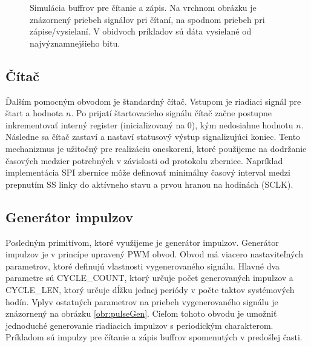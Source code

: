\begin{figure}
    \centering
    \vfill
    \caption[Simulácia buffrov pre čítanie a zápis]{Simulácia buffrov pre čítanie a zápis. Na vrchnom obrázku je znázornený priebeh signálov pri čítaní, na spodnom priebeh pri zápise/vysielaní. V obidvoch príkladov sú dáta vysielané od najvýznamnejšieho bitu.}
    \label{obr:bufferSim}
\end{figure}

\subsection{Čítač}
Ďalším pomocným obvodom je štandardný čítač. Vstupom je riadiaci signál pre štart a hodnota $n$. Po prijatí štartovacieho signálu čítač začne postupne inkrementovať interný register (inicializovaný na 0), kým nedosiahne hodnotu $n$. Následne sa čítač zastaví a nastaví statusový výstup signalizujúci koniec. Tento mechanizmus je užitočný pre realizáciu oneskorení, ktoré použijeme na dodržanie časových medzier potrebných v závislosti od protokolu zbernice. Napríklad implementácia SPI zbernice môže definovať minimálny časový interval medzi prepnutím SS linky do aktívneho stavu a prvou hranou na hodinách (SCLK).

\subsection{Generátor impulzov}
Posledným primitívom, ktoré využijeme je generátor impulzov. Generátor impulzov je v princípe upravený PWM obvod. Obvod má viacero nastaviteľných parametrov, ktoré definujú vlastnosti vygenerovaného signálu. Hlavné dva parametre sú CYCLE\_COUNT, ktorý určuje počet generovaných impulzov a CYCLE\_LEN, ktorý určuje dĺžku jednej periódy v počte taktov systémových hodín. Vplyv ostatných parametrov na priebeh vygenerovaného signálu je znázornený na obrázku \ref{obr:pulseGen}. Cieľom tohoto obvodu je umožniť jednoduché generovanie riadiacich impulzov s periodickým charakterom. Príkladom sú impulzy pre čítanie a zápis buffrov spomenutých v predošlej časti.

